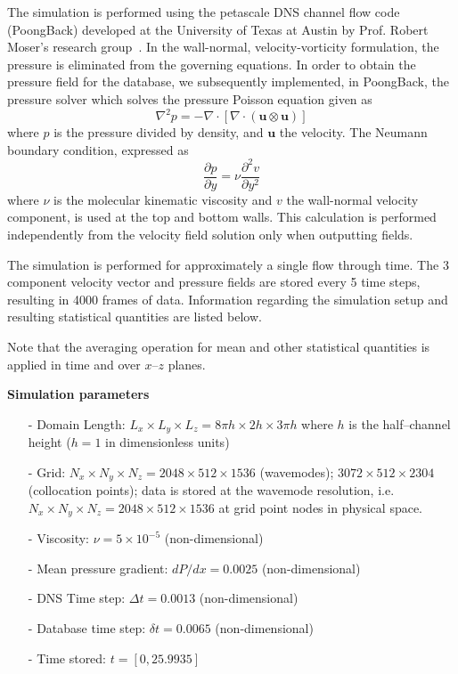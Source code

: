 \documentclass[11pt,letterpaper]{article}
\newcommand{\Div}[1] {\nabla \cdot #1}
\newcommand{\Lap}[1] {\nabla^2 #1}
\newcommand{\ppy}[1] {\frac{\partial #1}{\partial y}}
\newcommand{\ppyy}[1] {\frac{\partial^2 #1}{\partial y^2}}
\begin{document}
The simulation is performed using the petascale DNS channel flow code (PoongBack) developed at the University of Texas at Austin by Prof. Robert Moser's research group~\cite{Lee2013}. In the wall-normal, velocity-vorticity formulation, the pressure is eliminated from the governing equations. In order to obtain the pressure field for the database, we subsequently implemented, in PoongBack, the pressure solver which solves the pressure Poisson equation given as
\begin{equation}
  \Lap{p} = -\Div{\left[\Div{\left(\bm{u}\otimes\bm{u}\right)}\right]}
\end{equation}
where $p$ is the pressure divided by density, and $\bm{u}$ the velocity. The Neumann boundary condition, expressed as
\begin{equation}
  \ppy{p} = \nu \ppyy{v}
\end{equation}
where $\nu$ is the molecular kinematic viscosity and $v$ the wall-normal velocity component, is used at the top and bottom walls. This calculation is performed independently from the velocity field solution only when outputting fields.  

The simulation is performed for approximately a single flow through time. The 3 component velocity vector and pressure fields are stored every 5 time steps, resulting in 4000 frames of data. Information regarding the simulation setup and resulting statistical quantities are listed below. 

Note that the averaging operation for mean and other statistical quantities is applied in time and over $x$--$z$ planes.

\newpage
\noindent \textbf{Simulation parameters}
\begin{itemize}
\itemsep0em
\item[-] Domain Length: $L_x \times L_y \times L_z = 8\pi h \times 2h \times 3\pi h$ where $h$ is the half--channel height ($h=1$ in dimensionless units)
\item[-] Grid: $N_x \times N_y \times N_z = 2048 \times 512 \times 1536$ (wavemodes); $3072 \times 512 \times 2304$ (collocation points); data is stored at the wavemode resolution, i.e. $N_x \times N_y \times N_z = 2048 \times 512 \times 1536$ at grid point nodes in physical space.
\item[-] Viscosity: $\nu = 5\times 10^{-5}$ (non-dimensional)
\item[-] Mean pressure gradient: $dP/dx = 0.0025$ (non-dimensional)
\item[-] DNS Time step: $\Delta t = 0.0013$ (non-dimensional)
\item[-] Database time step: $\delta t = 0.0065$ (non-dimensional)
\item[-] Time stored: $t=[0,25.9935]$
\end{itemize}
\end{document}
